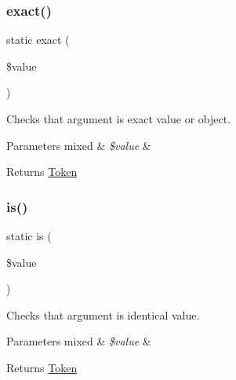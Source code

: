 \subsubsection{\texorpdfstring{exact()}{exact()}}
{\footnotesize\ttfamily static exact (\begin{DoxyParamCaption}\item[{}]{\$value }\end{DoxyParamCaption})\hspace{0.3cm}{\ttfamily [static]}}

Checks that argument is exact value or object.


\begin{DoxyParams}[1]{Parameters}
mixed & {\em \$value} & \\
\hline
\end{DoxyParams}
\begin{DoxyReturn}{Returns}
\mbox{\hyperlink{namespace_prophecy_1_1_argument_1_1_token}{Token}} 
\end{DoxyReturn}
\mbox{\label{class_prophecy_1_1_argument_a938d0098a841a76a6280ced240543563}} 
\subsubsection{\texorpdfstring{is()}{is()}}
{\footnotesize\ttfamily static is (\begin{DoxyParamCaption}\item[{}]{\$value }\end{DoxyParamCaption})\hspace{0.3cm}{\ttfamily [static]}}

Checks that argument is identical value.


\begin{DoxyParams}[1]{Parameters}
mixed & {\em \$value} & \\
\hline
\end{DoxyParams}
\begin{DoxyReturn}{Returns}
\mbox{\hyperlink{namespace_prophecy_1_1_argument_1_1_token}{Token}} 
\end{DoxyReturn}
\mbox{\label{class_prophecy_1_1_argument_a51deeacf7979333a7c4cc80a390252b4}} 

